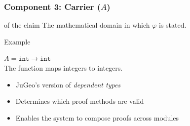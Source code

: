 \begin{frame}
\frametitle{Component 3: Carrier ($A$)}
\begin{block}{ of the claim}
  The mathematical domain in which $\varphi$ is stated.
\end{block}
\vspace{6pt}
\begin{exampleblock}{Example}
  \begin{center}
    $A = \texttt{int} \to \texttt{int}$\\[6pt]
    The function maps integers to integers.
  \end{center}
\end{exampleblock}
\vspace{8pt}
\begin{itemize}
  \item JuGeo's version of \emph{dependent types}
  \item Determines which proof methods are valid
  \item Enables the system to compose proofs across modules
\end{itemize}
\end{frame}

